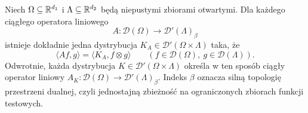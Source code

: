 \begin{twierdzenie}
\label{thm:schwartz-kernel23}
Niech $\Omega\subseteq\mathbb R^{d_1}$ i
$\Lambda\subseteq\mathbb R^{d_2}$ będą niepustymi zbiorami
otwartymi. Dla każdego ciągłego operatora liniowego
\[
 A:\mathcal D(\Omega)\longrightarrow
 \mathcal D'(\Lambda)_\beta
\]
istnieje dokładnie jedna dystrybucja
$K_A\in\mathcal D'(\Omega\times\Lambda)$ taka, że
\[
 \langle Af,g\rangle=\langle K_A,f\otimes g\rangle
 \qquad(f\in\mathcal D(\Omega),\ g\in\mathcal D(\Lambda)).
\]
Odwrotnie, każda dystrybucja
$K\in\mathcal D'(\Omega\times\Lambda)$ określa w ten
sposób ciągły operator liniowy
$A_K:\mathcal D(\Omega)\to\mathcal D'(\Lambda)_\beta$.
Indeks $\beta$ oznacza silną topologię przestrzeni dualnej,
czyli jednostajną zbieżność na ograniczonych zbiorach
funkcji testowych.
\end{twierdzenie}
